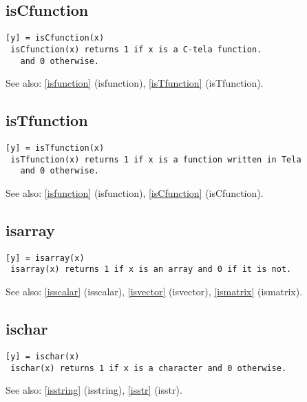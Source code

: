 \documentclass[a4paper]{article}
\begin{document}
\subsection{isCfunction\label{isCfunction}}

\begin{tscreen}
\begin{verbatim}
[y] = isCfunction(x)
 isCfunction(x) returns 1 if x is a C-tela function.
   and 0 otherwise.
\end{verbatim}

See also: \ref{isfunction} {(isfunction)}, \ref{isTfunction} {(isTfunction)}.
\end{tscreen}



\subsection{isTfunction\label{isTfunction}}

\begin{tscreen}
\begin{verbatim}
[y] = isTfunction(x)
 isTfunction(x) returns 1 if x is a function written in Tela
   and 0 otherwise.
\end{verbatim}

See also: \ref{isfunction} {(isfunction)}, \ref{isCfunction} {(isCfunction)}.
\end{tscreen}



\subsection{isarray\label{isarray}}

\begin{tscreen}
\begin{verbatim}
[y] = isarray(x)
 isarray(x) returns 1 if x is an array and 0 if it is not.
\end{verbatim}

See also: \ref{isscalar} {(isscalar)}, \ref{isvector} {(isvector)}, \ref{ismatrix} {(ismatrix)}.
\end{tscreen}



\subsection{ischar\label{ischar}}

\begin{tscreen}
\begin{verbatim}
[y] = ischar(x)
 ischar(x) returns 1 if x is a character and 0 otherwise.
\end{verbatim}

See also: \ref{isstring} {(isstring)}, \ref{isstr} {(isstr)}.
\end{tscreen}
\end{document}
